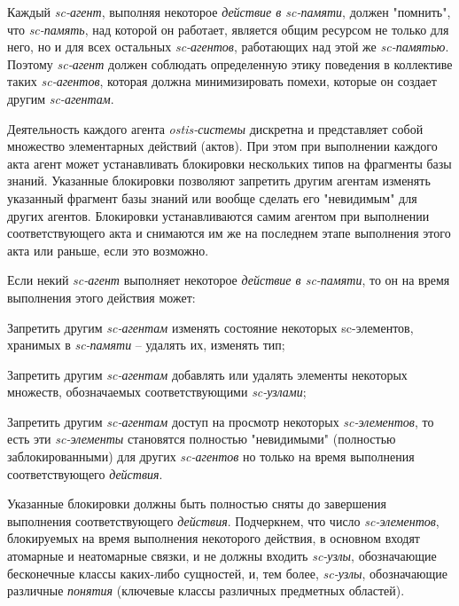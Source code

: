\begin{textitemize}
	\item Каждый \textit{sc-агент}, выполняя некоторое \textit{действие в sc-памяти}, должен "помнить"{}, что \textit{sc-память}, над которой он работает, является общим ресурсом не только для него, но и для всех остальных \textit{\mbox{sc-агентов}}, работающих над этой же \textit{sc-памятью}. Поэтому \textit{sc-агент} должен соблюдать определенную этику поведения в коллективе таких \textit{sc-агентов}, которая должна минимизировать помехи, которые он создает другим \textit{sc-агентам}.
	
	\item Деятельность каждого агента \textit{ostis-системы} дискретна и представляет собой множество элементарных действий (актов). При этом при выполнении каждого акта агент может устанавливать блокировки нескольких типов на фрагменты базы знаний. Указанные блокировки позволяют запретить другим агентам изменять указанный фрагмент базы знаний или вообще сделать его "невидимым"{} для других агентов. Блокировки устанавливаются самим агентом при выполнении соответствующего акта и снимаются им же на последнем этапе выполнения этого акта или раньше, если это возможно.
	\item Если некий \textit{sc-агент} выполняет некоторое \textit{действие в sc-памяти}, то он на время выполнения этого действия может:
	\begin{textitemize}
		\item Запретить другим \textit{sc-агентам} изменять состояние некоторых sc-элементов, хранимых в \textit{sc-памяти} -- удалять их, изменять тип;
		\item Запретить другим \textit{sc-агентам} добавлять или удалять элементы некоторых множеств, обозначаемых соответствующими \textit{sc-узлами};
		\item Запретить другим \textit{sc-агентам} доступ на просмотр некоторых \textit{sc-элементов}, то есть эти \textit{\mbox{sc-элементы}} становятся полностью "невидимыми"{} (полностью заблокированными) для других \textit{sc-агентов} но только на время выполнения соответствующего \textit{действия}.
	\end{textitemize}
	\vspace{-2\parskip}
	Указанные блокировки должны быть полностью сняты до завершения выполнения соответствующего \textit{действия}. Подчеркнем, что число \textit{sc-элементов}, блокируемых на время выполнения некоторого действия, в основном входят атомарные и неатомарные связки, и не должны входить \textit{sc-узлы}, обозначающие бесконечные классы каких-либо сущностей, и, тем более, \textit{sc-узлы}, обозначающие различные \textit{понятия} (ключевые классы различных предметных областей).

\end{textitemize}
